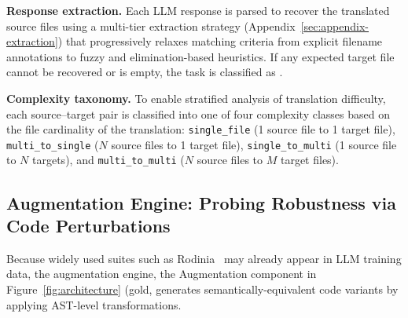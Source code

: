 \textbf{Response extraction.} Each LLM response is parsed to recover the translated source files using a multi-tier extraction strategy (Appendix~\ref{sec:appendix-extraction}) that progressively relaxes matching criteria from explicit filename annotations to fuzzy and elimination-based heuristics. If any expected target file cannot be recovered or is empty, the task is classified as \extractionfail{}.
  
\textbf{Complexity taxonomy.} To enable stratified analysis of translation difficulty, each source--target pair is classified into one of four complexity classes based on the file cardinality of the translation: \texttt{single\_file} (1 source file to 1 target file), \texttt{multi\_to\_single} ($N$ source files to 1 target file), \texttt{single\_to\_multi} (1 source file to $N$ targets), and \texttt{multi\_to\_multi} ($N$ source files to $M$ target files).

\subsection{Augmentation Engine: Probing Robustness via Code Perturbations}
\label{sec:augmentation-engine}

Because widely used suites such as Rodinia~\cite{Rodinia2009} may already appear in LLM training data, the augmentation engine, the Augmentation component in Figure~\ref{fig:architecture} (gold, generates semantically-equivalent code variants by applying AST-level transformations.

